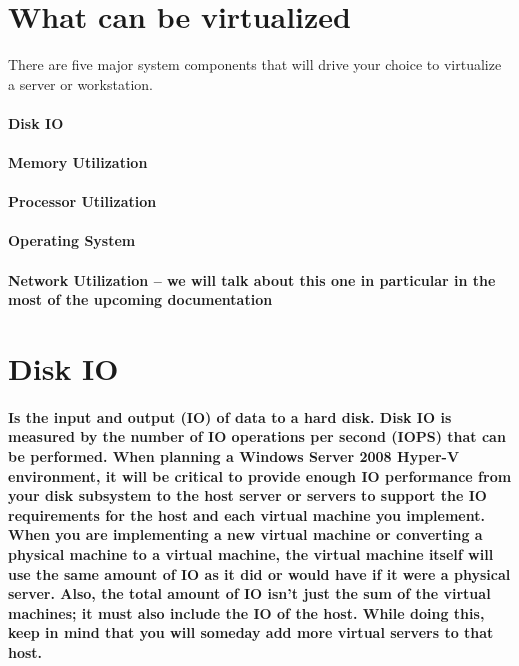 \documentclass[a4paper,12pt]{report}
\begin{document}
\section{What can be virtualized}

There are five major system components that will drive your choice to virtualize a server or workstation.
\paragraph{Disk IO}
\paragraph{Memory Utilization}
\paragraph{Processor Utilization}
\paragraph{Operating System}
\paragraph{Network Utilization – we will talk about this one in particular in the most of the upcoming documentation}

\section{Disk IO}

\paragraph{Is the input and output (IO) of data to a hard disk. Disk IO is measured by the
number of IO operations per second (IOPS) that can be performed. When planning a
Windows Server 2008 Hyper-V environment, it will be critical to provide enough IO
performance from your disk subsystem to the host server or servers to support the IO requirements for the host and each virtual machine you implement. When you are implementing a new virtual machine or converting a physical machine to a virtual machine, the virtual machine itself will use the same amount of IO as it did or would have if it were a physical server. Also, the total amount of IO isn’t just the sum of the virtual machines; it must also include the IO of the host. While doing this, keep in mind that you will someday add more virtual servers to that host.
}
\end{document}
